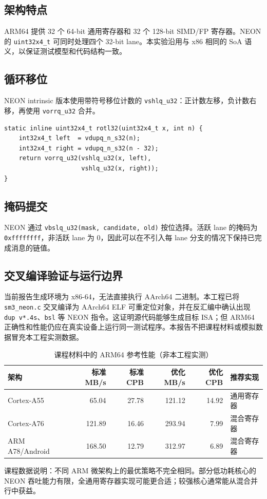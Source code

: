 \documentclass[UTF8,a4paper,12pt]{ctexart}
\newcommand{\code}[1]{\texttt{#1}}
\begin{document}
\subsection{架构特点}
ARM64 提供 32 个 64-bit 通用寄存器和 32 个 128-bit SIMD/FP 寄存器。NEON 的 \code{uint32x4\_t} 可同时处理四个 32-bit lane。本实验沿用与 x86 相同的 SoA 语义，以保证测试模型和代码结构一致。

\subsection{循环移位}
NEON intrinsic 版本使用带符号移位计数的 \code{vshlq\_u32}：正计数左移，负计数右移，再使用 \code{vorrq\_u32} 合并。
\begin{lstlisting}[style=cstyle,caption={ARM64 NEON 循环左移}]
static inline uint32x4_t rotl32(uint32x4_t x, int n) {
    int32x4_t left  = vdupq_n_s32(n);
    int32x4_t right = vdupq_n_s32(n - 32);
    return vorrq_u32(vshlq_u32(x, left),
                     vshlq_u32(x, right));
}
\end{lstlisting}

\subsection{掩码提交}
NEON 通过 \code{vbslq\_u32(mask, candidate, old)} 按位选择。活跃 lane 的掩码为 \code{0xffffffff}，非活跃 lane 为 0，因此可以在不引入每 lane 分支的情况下保持已完成消息的链值。

\subsection{交叉编译验证与运行边界}
当前报告生成环境为 x86-64，无法直接执行 AArch64 二进制。本工程已将 \code{sm3\_neon.c} 交叉编译为 AArch64 ELF 可重定位对象，并在反汇编中确认出现 \code{dup v*.4s}、\code{bsl} 等 NEON 指令。这证明源代码能够生成目标 ISA；但 ARM64 正确性和性能仍应在真实设备上运行同一测试程序。本报告不把课程材料或模拟数据冒充本工程实测数据。

\begin{table}[H]
\centering
\caption{课程材料中的 ARM64 参考性能（非本工程实测）}
\begin{tabular}{lrrrrl}
\toprule
架构 & 标准 MB/s & 标准 CPB & 优化 MB/s & 优化 CPB & 推荐实现 \\
\midrule
Cortex-A55 & 65.04 & 27.78 & 121.12 & 14.92 & 通用寄存器 \\
Cortex-A76 & 121.89 & 16.46 & 293.94 & 7.99 & 混合寄存器 \\
ARM A78/Android & 168.50 & 12.79 & 312.97 & 6.89 & 混合寄存器 \\
\bottomrule
\end{tabular}
\end{table}
课程数据说明：不同 ARM 微架构上的最优策略不完全相同。部分低功耗核心的 NEON 吞吐能力有限，全通用寄存器实现可能更合适；较强核心通常能从混合并行中获益。
\end{document}

